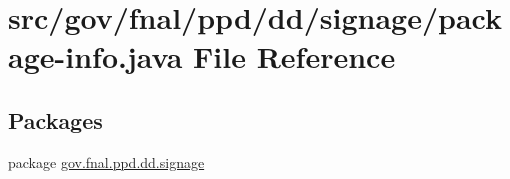 \hypertarget{gov_2fnal_2ppd_2dd_2signage_2package-info_8java}{\section{src/gov/fnal/ppd/dd/signage/package-\/info.java File Reference}
\label{gov_2fnal_2ppd_2dd_2signage_2package-info_8java}
}
\subsection*{Packages}
\begin{DoxyCompactItemize}
\item 
package \hyperlink{namespacegov_1_1fnal_1_1ppd_1_1dd_1_1signage}{gov.\-fnal.\-ppd.\-dd.\-signage}
\end{DoxyCompactItemize}
